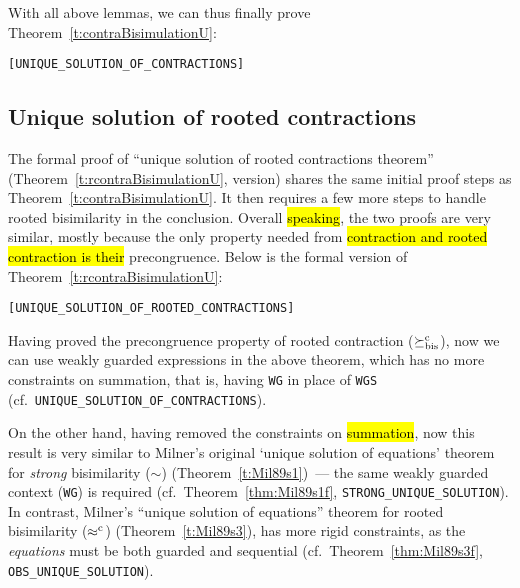 With all above lemmas, we can thus finally prove Theorem~\ref{t:contraBisimulationU}:
\begin{alltt}
\HOLTokenTurnstile{}   \HOLSymConst{\HOLTokenConj{}}  \HOLSymConst{\HOLTokenContracts{}}   \HOLSymConst{\HOLTokenConj{}}  \HOLSymConst{\HOLTokenContracts{}}   \HOLSymConst{\HOLTokenImp{}}  \HOLSymConst{\HOLTokenWeakEQ} \hfill{[UNIQUE_SOLUTION_OF_CONTRACTIONS]}
\end{alltt}

\subsection{Unique solution of rooted contractions}

The formal proof of ``unique solution of rooted contractions theorem''
(Theorem~\ref{t:rcontraBisimulationU}, \univariate version) shares the
same initial proof steps as Theorem~\ref{t:contraBisimulationU}.
It then requires a
few more steps to handle rooted bisimilarity in the conclusion. 
Overall \hl{speaking}, the two proofs are very similar, mostly because
the only property needed from \hl{contraction and rooted contraction is their} precongruence.
Below is the formal version of Theorem~\ref{t:rcontraBisimulationU}:
\begin{alltt}
\HOLTokenTurnstile{}   \HOLSymConst{\HOLTokenConj{}}  \HOLSymConst{\HOLTokenObsContracts}   \HOLSymConst{\HOLTokenConj{}}  \HOLSymConst{\HOLTokenObsContracts}   \HOLSymConst{\HOLTokenImp{}}  \HOLSymConst{\HOLTokenObsCongr} \hfill{[UNIQUE_SOLUTION_OF_ROOTED_CONTRACTIONS]}
\end{alltt}

Having proved the precongruence property of rooted contraction ($\mathrel{\succeq^{\rm{c}}_{\rm{bis}}}$), 
now we can use weakly guarded expressions in the above theorem,
which has no more constraints on summation, that is, having
\texttt{WG} in place of \texttt{WGS} (cf.~\texttt{UNIQUE_SOLUTION_OF_CONTRACTIONS}).

On the other hand, having removed the constraints on \hl{summation}, now
this result is very similar to Milner's original `unique solution of
equations' theorem for \emph{strong} bisimilarity ($\sim$) (Theorem~\ref{t:Mil89s1})~--- 
the same weakly guarded context (\texttt{WG}) is required
(cf.~Theorem~\ref{thm:Mil89s1f}, \texttt{STRONG_UNIQUE_SOLUTION}).
In contrast, Milner's ``unique solution of
equations'' theorem for rooted bisimilarity ($\mathrel{\approx^{\rm{c}}}$) (Theorem~\ref{t:Mil89s3}),
has more rigid constraints, as the \emph{equations} must be both guarded and
sequential (cf.~Theorem~\ref{thm:Mil89s3f}, \texttt{OBS_UNIQUE_SOLUTION}).

